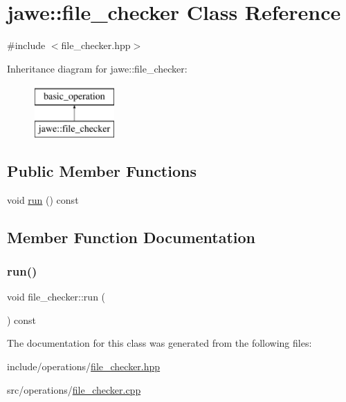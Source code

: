 \hypertarget{classjawe_1_1file__checker}{}\section{jawe\+:\+:file\+\_\+checker Class Reference}
\label{classjawe_1_1file__checker}


{\ttfamily \#include $<$file\+\_\+checker.\+hpp$>$}

Inheritance diagram for jawe\+:\+:file\+\_\+checker\+:\begin{figure}[H]
\begin{center}
\leavevmode
\includegraphics[height=2.000000cm]{classjawe_1_1file__checker}
\end{center}
\end{figure}
\subsection*{Public Member Functions}
\begin{DoxyCompactItemize}
\item 
void \hyperlink{classjawe_1_1file__checker_ae0f4f3a76e2d85024fd35bea0e119c0f}{run} () const
\end{DoxyCompactItemize}


\subsection{Member Function Documentation}
\mbox{\label{classjawe_1_1file__checker_ae0f4f3a76e2d85024fd35bea0e119c0f}} 
\subsubsection{\texorpdfstring{run()}{run()}}
{\footnotesize\ttfamily void file\+\_\+checker\+::run (\begin{DoxyParamCaption}{ }\end{DoxyParamCaption}) const}



The documentation for this class was generated from the following files\+:\begin{DoxyCompactItemize}
\item 
include/operations/\hyperlink{file__checker_8hpp}{file\+\_\+checker.\+hpp}\item 
src/operations/\hyperlink{file__checker_8cpp}{file\+\_\+checker.\+cpp}\end{DoxyCompactItemize}
